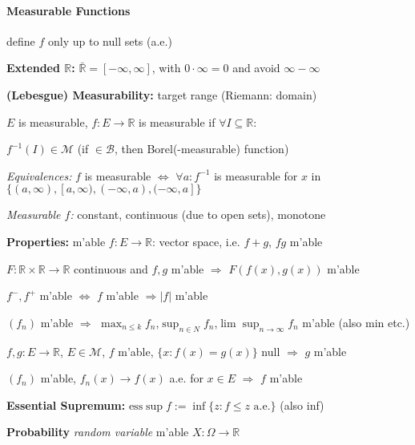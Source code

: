 \documentclass[8pt,twoside]{extarticle}
\begin{document}
\begin{multicols}{2}
\paragraph{Measurable Functions} define $f$ only up to null sets (a.e.)

\textbf{Extended $\mathbb{R}$:} $\bar{\mathbb{R}} = [-\infty, \infty]$, with $0\cdot\infty=0$ and avoid $\infty{-}\infty$

\textbf{(Lebesgue) Measurability:} target range (Riemann: domain)

$E$ is measurable, $f:E\to\mathbb{R}$ is measurable if $\forall I \subseteq \mathbb{R}:$

$f^{-1}(I)\in \mathcal{M}$ (if $\in \mathcal{B}$, then Borel(-measurable) function)

\textit{Equivalences:} $f$ is measurable $\Leftrightarrow$ $\forall a: f^{-1}$ is measurable \newline for $x$ in $\{(a,\infty),[a,\infty), (-\infty,a), (-\infty,a]\}$

\textit{Measurable $f$:} constant, continuous (due to open sets), monotone

\textbf{Properties:}
m'able $f:E{\to}\mathbb{R}$: vector space, i.e. $f{+}g$, $fg$ m'able

$F:\mathbb{R}\times\mathbb{R}\to \mathbb{R}$ continuous and $f,g$ m'able $\Rightarrow$ $F(f(x),g(x))$ m'able

$f^-,f^+$ m'able $\Leftrightarrow$ $f$ m'able $\Rightarrow |f|$ m'able


$(f_n)$ m'able $\Rightarrow$ $\displaystyle\max_{n\leq k} f_n$,$\displaystyle\sup_{n\in N} f_n$,$\displaystyle\lim\sup_{n{\to} \infty} f_n$ m'able (also min etc.)

$f,g: E{\to} \mathbb{R}$, $E\in \mathcal{M}$, $f$ m'able, $\{x: f(x)=g(x)\}$ null $\Rightarrow$ $g$ m'able

$(f_n)$ m'able, $f_n(x)\to f(x)$ a.e. for $x\in E$ $\Rightarrow$ $f$ m'able

\textbf{Essential Supremum:} $\mathrm{ess}\sup f:=\inf\{z:f\leq z \text{ a.e.}\}$ (also inf)


\textbf{Probability} \textit{random variable} m'able $X:\Omega \to \mathbb{R}$


\end{multicols}
\end{document}
